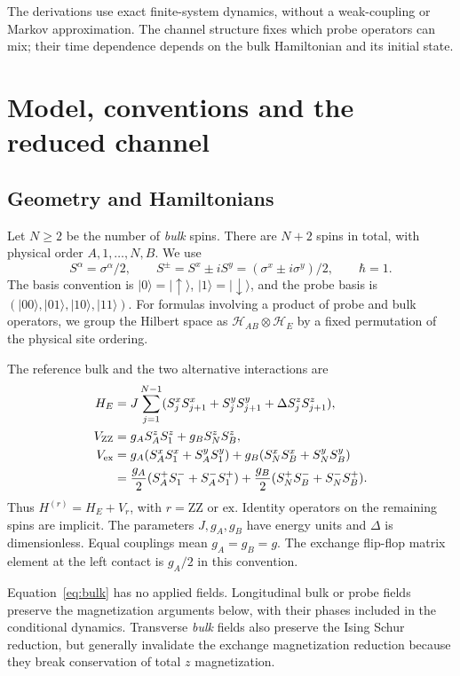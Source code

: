 \documentclass[11pt,a4paper]{article}
\newcommand{\ket}[1]{\lvert #1\rangle}
\newcommand{\HH}{\mathcal H}
\newcommand{\ZZ}{\mathrm{ZZ}}
\newcommand{\ex}{\mathrm{ex}}
\begin{document}
The derivations use exact finite-system dynamics, without a weak-coupling
or Markov approximation. The channel structure fixes which probe
operators can mix; their time dependence depends on the bulk Hamiltonian
and its initial state.

\section{Model, conventions and the reduced channel}
\label{sec:model}

\subsection{Geometry and Hamiltonians}

Let $N\ge2$ be the number of \emph{bulk} spins. There are $N+2$ spins in
total, with physical order $A,1,\ldots,N,B$. We use
\begin{equation}
 S^\alpha=\sigma^\alpha/2,\qquad
 S^\pm=S^x\pm iS^y=(\sigma^x\pm i\sigma^y)/2,\qquad \hbar=1.
\end{equation}
The basis convention is $\ket0=\ket\uparrow$, $\ket1=\ket\downarrow$,
and the probe basis is $(\ket{00},\ket{01},\ket{10},\ket{11})$.
For formulas involving a product of probe and bulk operators, we group
the Hilbert space as $\HH_{AB}\otimes\HH_E$ by a fixed permutation
of the physical site ordering.

The reference bulk and the two alternative interactions are
\begin{align}
 H_E&=J\sum_{j=1}^{N-1}
 (S_j^xS_{j+1}^x+S_j^yS_{j+1}^y+\Delta S_j^zS_{j+1}^z),
 \label{eq:bulk}\\
 V_{\ZZ}&=g_A S_A^zS_1^z+g_B S_N^zS_B^z,
 \label{eq:ising}\\
 V_{\ex}&=g_A(S_A^xS_1^x+S_A^yS_1^y)
          +g_B(S_N^xS_B^x+S_N^yS_B^y)\notag\\
 &=\frac{g_A}{2}(S_A^+S_1^-+S_A^-S_1^+)
   +\frac{g_B}{2}(S_N^+S_B^-+S_N^-S_B^+).
 \label{eq:exchange}
\end{align}
Thus $H^{(r)}=H_E+V_r$, with $r=\ZZ$ or $\ex$.
Identity operators on the remaining spins are implicit. The parameters
$J,g_A,g_B$ have energy units and $\Delta$ is dimensionless. Equal
couplings mean $g_A=g_B=g$. The exchange flip-flop matrix element at
the left contact is $g_A/2$ in this convention.

Equation~\eqref{eq:bulk} has no applied fields. Longitudinal bulk or probe
fields preserve the magnetization arguments below, with their phases
included in the conditional dynamics. Transverse \emph{bulk} fields also
preserve the Ising Schur reduction, but generally invalidate the exchange
magnetization reduction because they break conservation of total
$z$ magnetization.
\end{document}
